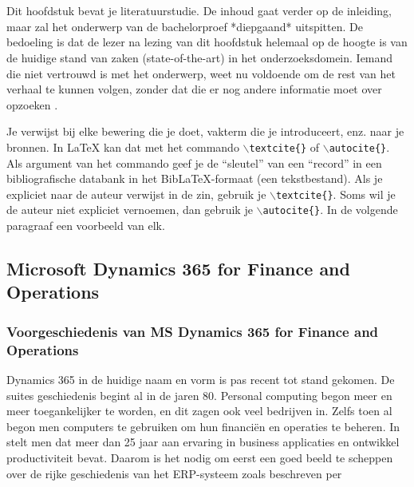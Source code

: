 \chapter{}
\label{ch:stand-van-zaken}



Dit hoofdstuk bevat je literatuurstudie. De inhoud gaat verder op de inleiding, maar zal het onderwerp van de bachelorproef *diepgaand* uitspitten. De bedoeling is dat de lezer na lezing van dit hoofdstuk helemaal op de hoogte is van de huidige stand van zaken (state-of-the-art) in het onderzoeksdomein. Iemand die niet vertrouwd is met het onderwerp, weet nu voldoende om de rest van het verhaal te kunnen volgen, zonder dat die er nog andere informatie moet over opzoeken \autocite{Pollefliet2011}.

Je verwijst bij elke bewering die je doet, vakterm die je introduceert, enz. naar je bronnen. In \LaTeX{} kan dat met het commando \texttt{$\backslash${textcite\{\}}} of \texttt{$\backslash${autocite\{\}}}. Als argument van het commando geef je de ``sleutel'' van een ``record'' in een bibliografische databank in het Bib\LaTeX{}-formaat (een tekstbestand). Als je expliciet naar de auteur verwijst in de zin, gebruik je \texttt{$\backslash${}textcite\{\}}.
Soms wil je de auteur niet expliciet vernoemen, dan gebruik je \texttt{$\backslash${}autocite\{\}}. In de volgende paragraaf een voorbeeld van elk.


\section{Microsoft Dynamics 365 for Finance and Operations}
\subsection{Voorgeschiedenis van MS Dynamics 365 for Finance and Operations}
Dynamics 365 in de huidige naam en vorm is pas recent tot stand gekomen. De suites geschiedenis begint al in de jaren 80. Personal computing begon meer en meer toegankelijker te worden, en dit zagen ook veel bedrijven in. Zelfs toen al begon men  computers te gebruiken om hun financiën en operaties te beheren. In \textcite{Olsen et al.2009} stelt men dat meer dan 25 jaar aan ervaring in business applicaties en ontwikkel productiviteit bevat. Daarom is het nodig om eerst een goed beeld te scheppen over de rijke geschiedenis van het ERP-systeem zoals beschreven per \textcite{Wright2018}

